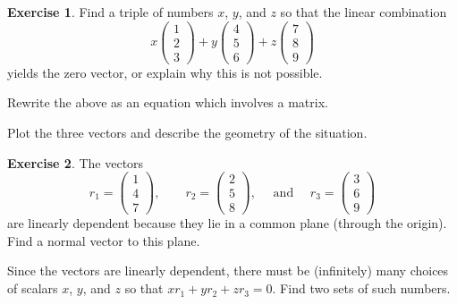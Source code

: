 \documentclass[11pt]{amsart}
\theoremstyle{definition}
\newtheorem{exercise}{Exercise}
\begin{document}
\vspace{1cm}

\begin{exercise}
Find a triple of numbers $x$, $y$, and $z$ so that the linear combination
\[
x \begin{pmatrix} 1 \\ 2 \\ 3 \end{pmatrix} + y \begin{pmatrix} 4 \\ 5\\ 6 \end{pmatrix} + z \begin{pmatrix} 7 \\ 8 \\ 9 \end{pmatrix}
\]
yields the zero vector, or explain why this is not possible.

Rewrite the above as an equation which involves a matrix.

Plot the three vectors and describe the geometry of the situation.

\end{exercise}

\vspace{1cm}

\begin{exercise}
The vectors
\[
r_1 = \begin{pmatrix} 1 \\ 4 \\ 7 \end{pmatrix}, \qquad
r_2 = \begin{pmatrix} 2 \\ 5 \\ 8 \end{pmatrix}, \quad \text{ and } \quad
r_3 = \begin{pmatrix} 3 \\ 6 \\ 9 \end{pmatrix}
\]
are linearly dependent because they lie in a common plane (through the origin). Find a normal vector to this plane.

Since the vectors are linearly dependent, there must be (infinitely) many choices of scalars $x$, $y$, and $z$ so that $x r_1 + y r_2 + z r_3 = 0$. Find two sets of such numbers.
\end{exercise}

\vspace{1cm}
\end{document}
